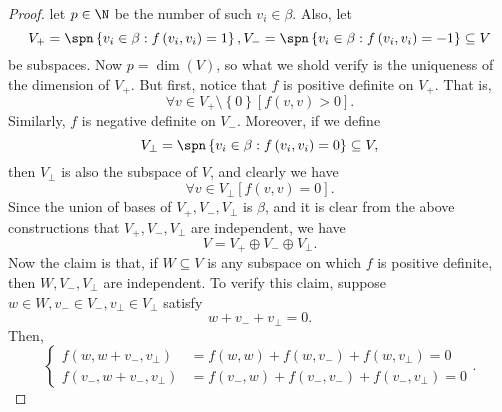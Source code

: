 \documentclass[linearalgebra]{subfiles}
\begin{document}
\begin{proof}
        let $p\in\N$ be the number of such $v_i\in\beta$. Also, let
        \begin{equation*}
            V_+ = \spn\left\lbrace v_i\in\beta: f\left( v_i,v_i \right) =1 \right\rbrace , V_-=\spn\left\lbrace v_i\in\beta: f\left( v_i,v_i \right) = -1 \right\rbrace \subseteq V 
        \end{equation*}
        be subspaces. Now $p=\dim\left( V \right)$, so what we shold verify is the uniqueness of the dimension of $V_+$. But first, notice that $f$ is positive definite on $V_+$. That is,
        \begin{equation*}
            \forall v\in V_+\setminus \left\lbrace 0 \right\rbrace \left[ f\left( v,v \right) > 0 \right].
        \end{equation*}
        Similarly, $f$ is negative definite on $V_-$. Moreover, if we define
        \begin{equation*}
            V_\perp = \spn\left\lbrace v_i\in\beta: f\left( v_i,v_i \right) =0 \right\rbrace \subseteq V,
        \end{equation*}
        then $V_\perp$ is also the subspace of $V$, and clearly we have
        \begin{equation*}
            \forall v\in V_\perp \left[ f\left( v,v \right) = 0 \right].
        \end{equation*}
        Since the union of bases of $V_+, V_-, V_\perp$ is $\beta$, and it is clear from the above constructions that $V_+, V_-, V_\perp$ are independent, we have
        \begin{equation*}
            V = V_+\oplus V_-\oplus V_\perp.
        \end{equation*}
        Now the claim is that, if $W\subseteq V$ is any subspace on which $f$ is positive definite, then $W, V_-, V_\perp$ are independent. To verify this claim, suppose $w\in W, v_-\in V_-, v_\perp\in V_\perp$ satisfy
        \begin{equation*}
            w + v_- + v_\perp = 0.
        \end{equation*}
        Then,
        \begin{equation*}
            \begin{cases} 
                f\left( w, w+v_-,v_\perp \right) & = f\left( w,w \right) + f\left( w,v_- \right) + f\left( w,v_\perp \right) = 0 \\
                f\left( v_-, w+v_-,v_\perp \right) & = f\left( v_-,w \right) + f\left( v_-,v_- \right) + f\left( v_-,v_\perp \right) = 0 
            \end{cases}.

\end{equation*}
\end{proof}
\end{document}
